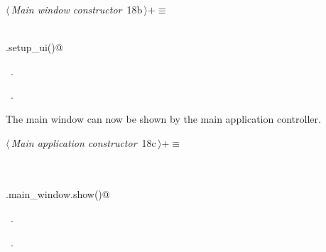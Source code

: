 \documentclass[
    a4paper,      %
    10pt,         %
    openright,    %
    notitlepage,  %
    parskip=half, %
]{scrreprt}       %
\theoremstyle{definition}                    %
\begin{document}
\begin{flushleft} \small
\begin{minipage}{\linewidth}\label{scrap13}\raggedright\small
{} $\langle\,${\itshape Main window constructor}\nobreak\ {\footnotesize {18b}}$\,\rangle+\equiv$
\vspace{-1ex}
\begin{list}{}{} \item
\mbox{}\lstinline@@\\
\mbox{}\lstinline@self.setup_ui()@\\
\mbox{}\lstinline@@{\NWsep}
\end{list}
\vspace{-1.5ex}
\footnotesize
\begin{list}{}{\setlength{\itemsep}{-\parsep}\setlength{\itemindent}{-\leftmargin}}
\item \NWtxtMacroDefBy\ .
\item \NWtxtMacroRefIn\ .

\item{}
\end{list}
\end{minipage}\vspace{4ex}
\end{flushleft}
The main window can now be shown by the main application controller.

\begin{flushleft} \small
\begin{minipage}{\linewidth}\label{scrap14}\raggedright\small
{} $\langle\,${\itshape Main application constructor}\nobreak\ {\footnotesize {18c}}$\,\rangle+\equiv$
\vspace{-1ex}
\begin{list}{}{} \item
\mbox{}\lstinline@@\\
\mbox{}\lstinline@@\\
\mbox{}\lstinline@self.main_window.show()@\\
\mbox{}\lstinline@@{\NWsep}
\end{list}
\vspace{-1.5ex}
\footnotesize
\begin{list}{}{\setlength{\itemsep}{-\parsep}\setlength{\itemindent}{-\leftmargin}}
\item \NWtxtMacroDefBy\ .
\item \NWtxtMacroRefIn\ .

\item{}
\end{list}
\end{minipage}\vspace{4ex}
\end{flushleft}
\end{document}
